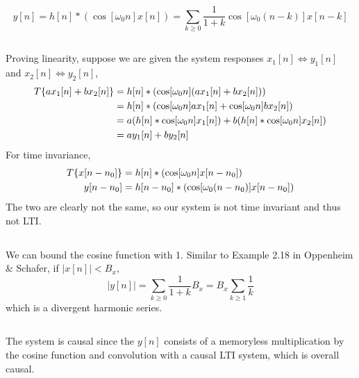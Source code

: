 \documentclass{article}
\begin{document}
\newpage
\section{}

\begin{equation}
    y[n] = h[n] \ast (\cos[\omega_0 n] x[n]) = \sum_{k \geqslant 0} \frac{1}{1 + k} \cos[\omega_0 (n - k)] x[n - k]
\end{equation}

\subsection{}
Proving linearity, suppose we are given the system responses \(x_1[n] \iff y_1[n]\) and \(x_2[n] \iff y_2[n]\),
\begin{align}
    T\{ax_1[n] + bx_2[n]\} &= h[n] \ast (\cosine[\omega_0 n] (ax_1[n] + bx_2[n])) \\
    &= h[n] \ast (\cos[\omega_0 n] ax_1[n] + \cos[\omega_0 n] bx_2[n]) \\
    &= a (h[n] \ast \cos[\omega_0 n] x_1[n]) + b (h[n] \ast \cos[\omega_0 n] x_2[n]) \\
    &= ay_1[n] + by_2[n]
\end{align}
For time invariance,
\begin{align}
    T\{x[n - n_0]\} &= h[n] \ast (\cosine[\omega_0 n] x[n - n_0]) \\
    y[n - n_0] &= h[n - n_0] \ast (\cosine[\omega_0 (n - n_0)] x[n - n_0])
\end{align}
The two are clearly not the same, so our system is not time invariant and thus not LTI.

\subsection{}

We can bound the cosine function with 1.
Similar to Example 2.18 in Oppenheim \& Schafer, if \(|x[n]| < B_x\),
\begin{equation}
    |y[n]| = \sum_{k \geqslant 0} \frac{1}{1 + k} B_x = B_x \sum_{k \geqslant 1} \frac{1}{k}
\end{equation}
which is a divergent harmonic series.

\subsection{}

The system is causal since the \(y[n]\) consists of a memoryless multiplication by the cosine function and convolution with a causal LTI system, which is overall causal.
\end{document}
